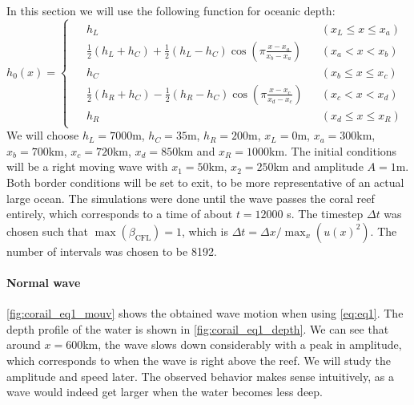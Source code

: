 In this section we will use the following function for oceanic depth:
\begin{equation}
    h_0(x) = \begin{cases}
        \begin{aligned}
            &h_L &&(x_L \le x \le x_a) \\
            &\frac{1}{2}(h_L + h_C) + \frac{1}{2}(h_L - h_C) \cos \left( \pi \frac{x-x_a}{x_b-x_a} \right) &&(x_a < x < x_b) \\
            &h_C &&(x_b \le x \le x_c) \\
            &\frac{1}{2}(h_R + h_C) - \frac{1}{2}(h_R - h_C) \cos \left( \pi \frac{x-x_c}{x_d-x_c} \right) &&(x_c < x < x_d) \\
            &h_R &&(x_d \le x \le x_R)
        \end{aligned}
    \end{cases}
\end{equation}
We will choose \(h_L = 7000\)m, \(h_C = 35\)m, \(h_R = 200\)m, \(x_L = 0\)m, \(x_a = 300\)km, \(x_b = 700\)km, \(x_c = 720\)km, \(x_d = 850\)km and \(x_R = 1000\)km. The initial conditions will be a right moving wave with \(x_1 = 50\)km, \(x_2 = 250\)km and amplitude \(A = 1\)m. Both border conditions will be set to exit, to be more representative of an actual large ocean. The simulations were done until the wave passes the coral reef entirely, which corresponds to a time of about \(t = 12000\) \si{\second}. The timestep \(\Delta t\) was chosen such that \(\max(\beta_{\textrm{CFL}}) = 1\), which is \(\Delta t = \Delta x / \max_x(u(x)^2)\). The number of intervals was chosen to be 8192.

\paragraph{Normal wave} \autoref{fig:corail_eq1_mouv} shows the obtained wave motion when using \autoref{eq:eq1}. The depth profile of the water is shown in \autoref{fig:corail_eq1_depth}. We can see that around \(x=600\)km, the wave slows down considerably with a peak in amplitude, which corresponds to when the wave is right above the reef. We will study the amplitude and speed later. The observed behavior makes sense intuitively, as a wave would indeed get larger when the water becomes less deep.

